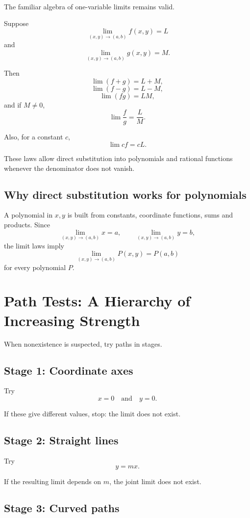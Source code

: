 \documentclass[11pt,oneside]{book}
\theoremstyle{studentthm}
\theoremstyle{definition}
\begin{document}
The familiar algebra of one-variable limits remains valid.

Suppose
\[
\lim_{(x,y)\to(a,b)}f(x,y)=L
\]
and
\[
\lim_{(x,y)\to(a,b)}g(x,y)=M.
\]

Then
\[
\lim(f+g)=L+M,
\]
\[
\lim(f-g)=L-M,
\]
\[
\lim(fg)=LM,
\]
and if \(M\ne0\),
\[
\lim\frac{f}{g}=\frac{L}{M}.
\]

Also, for a constant \(c\),
\[
\lim cf=cL.
\]

These laws allow direct substitution into polynomials and rational
functions whenever the denominator does not vanish.

\subsection*{Why direct substitution works for polynomials}

A polynomial in \(x,y\) is built from constants, coordinate functions,
sums and products. Since
\[
\lim_{(x,y)\to(a,b)}x=a,
\qquad
\lim_{(x,y)\to(a,b)}y=b,
\]
the limit laws imply
\[
\lim_{(x,y)\to(a,b)}P(x,y)=P(a,b)
\]
for every polynomial \(P\).

\section{Path Tests: A Hierarchy of Increasing Strength}

When nonexistence is suspected, try paths in stages.

\subsection*{Stage 1: Coordinate axes}

Try
\[
x=0
\quad\text{and}\quad
y=0.
\]

If these give different values, stop: the limit does not exist.

\subsection*{Stage 2: Straight lines}

Try
\[
y=mx.
\]

If the resulting limit depends on \(m\), the joint limit does not
exist.

\subsection*{Stage 3: Curved paths}
\end{document}
